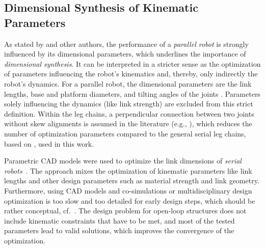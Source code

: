 \subsection{Dimensional Synthesis of Kinematic Parameters}
\label{sec:ds_soa_kinpar}

As stated by \cite{Merlet2006} and other authors, the performance of a \emph{parallel robot} is strongly influenced by its dimensional parameters, which underlines the importance of \emph{dimensional synthesis}.
It can be interpreted in {a} stricter sense as the optimization of parameters influencing the robot's kinematics and, thereby, only indirectly the robot's dynamics.
For a parallel robot, the dimensional parameters are the link lengths, base and platform diameters, and tilting angles of the joints \cite{SuDuaZhe2001,Krefft2006,CarboneOttCec2007,Zhang2009,KelaiaiaComZaa2012,Daake2012,Prause2016,BenHamidaLarMliRom2021}.
Parameters solely influencing the dynamics (like link strength) are excluded from this strict definition.
Within the leg chains, a perpendicular connection between two joints without skew alignments is assumed in the literature (e.g., \cite{Krefft2006,Prause2016}), which reduces the number of optimization parameters compared to the general serial leg chains, based on \cite{Gogu2008,Ramirez2018}, used in this work.

%
%
%
%
%


Parametric CAD models were used to optimize the link dimensions of \emph{serial} \mbox{\emph{robots}~\cite{TarkianPerOelFen2011,ZhouBai2015,TanLiaFanZha2019}.}
The approach mixes the optimization of kinematic parameters like link lengths and other design parameters such as material strength and link geometry.
Furthermore, using CAD models and co-simulations or multidisciplinary design optimization \cite{TarkianPerOelFen2011} is too slow and too detailed for early design steps, which should be rather conceptual, cf.~\cite{VDI2221}.
%
The design problem for open-loop structures does not include kinematic constraints that have to be met, and most of the tested parameters lead to valid solutions, which improves the convergence of the optimization.
%

